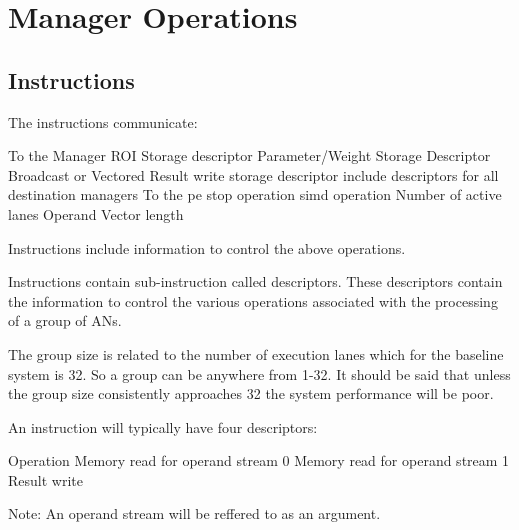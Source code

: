 \section{Manager Operations}
\label{sec:Manager Operations}

\subsection{Instructions}
\label{sec:Instructions}
The instructions communicate:

\begin{outline}
        \1 To the Manager
            \2 ROI Storage descriptor
            \2 Parameter/Weight Storage Descriptor
                \3 Broadcast or Vectored
            \2 Result write storage descriptor
                \3 include descriptors for all destination managers
        \1 To the \ac{pe}
            \2 \ac{stop} operation
            \2 \ac{simd} operation
            \2 Number of active lanes
            \2 Operand Vector length
\end{outline}

Instructions include information to control the above operations.

Instructions contain sub-instruction called descriptors. These descriptors contain the information to control the various operations associated with the processing of a group of ANs.

The group size is related to the number of execution lanes which for the baseline system is 32. So a group can be anywhere from 1-32. It should be said that unless the group size consistently approaches 32 the system performance will be poor.

An instruction will typically have four descriptors:

\begin{outline}
\renewcommand{\outlinei}{enumerate}
    \1 Operation
    \1 Memory read for operand stream 0
    \1 Memory read for operand stream 1
    \1 Result write
\end{outline}

Note: An operand stream will be reffered to as an argument.

